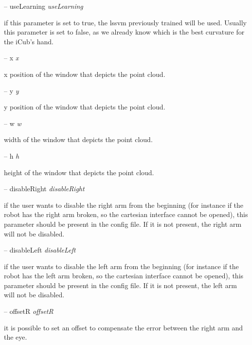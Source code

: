 -- use\+Learning {\itshape use\+Learning} 
\begin{DoxyItemize}
\item if this parameter is set to true, the lssvm previously trained will be used. Usually this parameter is set to false, as we already know which is the best curvature for the i\+Cub's hand.
\end{DoxyItemize}

-- x {\itshape x} 
\begin{DoxyItemize}
\item x position of the window that depicts the point cloud.
\end{DoxyItemize}

-- y {\itshape y} 
\begin{DoxyItemize}
\item y position of the window that depicts the point cloud.
\end{DoxyItemize}

-- w {\itshape w} 
\begin{DoxyItemize}
\item width of the window that depicts the point cloud.
\end{DoxyItemize}

-- h {\itshape h} 
\begin{DoxyItemize}
\item height of the window that depicts the point cloud.
\end{DoxyItemize}

-- disable\+Right {\itshape disable\+Right} 
\begin{DoxyItemize}
\item if the user wants to disable the right arm from the beginning (for instance if the robot has the right arm broken, so the cartesian interface cannot be opened), this parameter should be present in the config file. If it is not present, the right arm will not be disabled.
\end{DoxyItemize}

-- disable\+Left {\itshape disable\+Left} 
\begin{DoxyItemize}
\item if the user wants to disable the left arm from the beginning (for instance if the robot has the left arm broken, so the cartesian interface cannot be opened), this parameter should be present in the config file. If it is not present, the left arm will not be disabled.
\end{DoxyItemize}

-- offset\+R {\itshape offset\+R} 
\begin{DoxyItemize}
\item it is possible to set an offset to compensate the error between the right arm and the eye.
\end{DoxyItemize}

